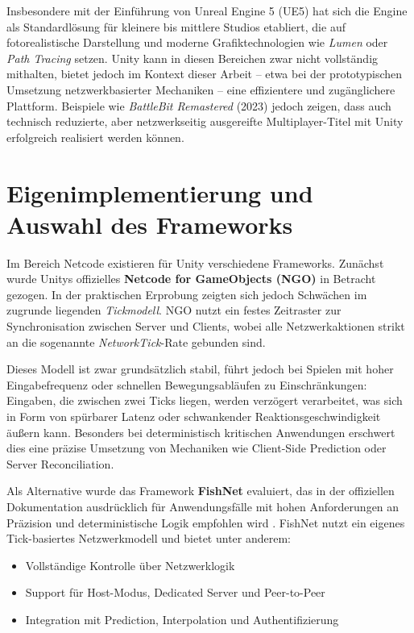 Insbesondere mit der Einführung von Unreal Engine 5 (UE5) hat sich die Engine als Standardlösung für kleinere bis mittlere Studios etabliert, die auf fotorealistische Darstellung und moderne Grafiktechnologien wie \textit{Lumen} oder \textit{Path Tracing} setzen. Unity kann in diesen Bereichen zwar nicht vollständig mithalten, bietet jedoch im Kontext dieser Arbeit -- etwa bei der prototypischen Umsetzung netzwerkbasierter Mechaniken -- eine effizientere und zugänglichere Plattform. Beispiele wie \textit{BattleBit Remastered} (2023) jedoch zeigen, dass auch technisch reduzierte, aber netzwerkseitig ausgereifte Multiplayer-Titel mit Unity erfolgreich realisiert werden können.

\section{Eigenimplementierung und Auswahl des Frameworks}


Im Bereich Netcode existieren für Unity verschiedene Frameworks. Zunächst wurde Unitys offizielles \textbf{Netcode for GameObjects (NGO)} in Betracht gezogen. In der praktischen Erprobung zeigten sich jedoch Schwächen im zugrunde liegenden \textit{Tickmodell}. NGO nutzt ein festes Zeitraster zur Synchronisation zwischen Server und Clients, wobei alle Netzwerkaktionen strikt an die sogenannte \textit{NetworkTick}-Rate gebunden sind.

Dieses Modell ist zwar grundsätzlich stabil, führt jedoch bei Spielen mit hoher Eingabefrequenz oder schnellen Bewegungsabläufen zu Einschränkungen: Eingaben, die zwischen zwei Ticks liegen, werden verzögert verarbeitet, was sich in Form von spürbarer Latenz oder schwankender Reaktionsgeschwindigkeit äußern kann. Besonders bei deterministisch kritischen Anwendungen erschwert dies eine präzise Umsetzung von Mechaniken wie Client-Side Prediction oder Server Reconciliation.


Als Alternative wurde das Framework \textbf{FishNet} evaluiert, das in der offiziellen Dokumentation ausdrücklich für Anwendungsfälle mit hohen Anforderungen an Präzision und deterministische Logik empfohlen wird \cite{fishnetdocs}. FishNet nutzt ein eigenes Tick-basiertes Netzwerkmodell und bietet unter anderem:

\begin{itemize}
    \item Vollständige Kontrolle über Netzwerklogik
    \item Support für Host-Modus, Dedicated Server und Peer-to-Peer
    \item Integration mit Prediction, Interpolation und Authentifizierung
\end{itemize}

